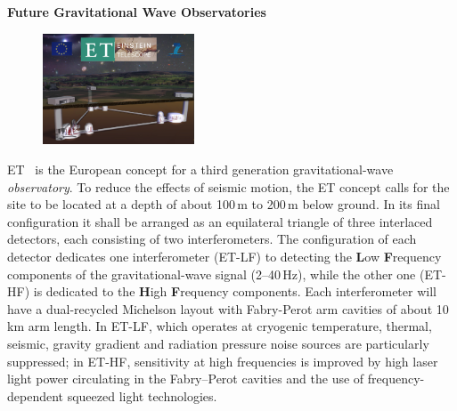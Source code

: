 \begin{DetBox}{\bf Future Gravitational Wave Observatories}
\label{Box:GWOs}
\begin{tcolorbox}[standard jigsaw,colback=amber!10!white,colframe=red!70!black,coltext=black,size=small,  title=The Einstein gravitational--wave Telescope (ET)] 
\begin{figure}
\vspace{-10pt}
\includegraphics*[width=0.4\textwidth]{Figures/ET_Thumb.png}
\label{fig:ET_Thumb}
\vspace{-25pt}
\end{figure}
ET~\cite{ET2011} is the European concept for a third generation gravitational-wave \emph{observatory}. To reduce the effects of seismic motion, the ET concept calls for the site to be located at a depth of about 100\,m to 200\,m below ground. In its final configuration it shall be arranged as an equilateral triangle of three interlaced detectors, each consisting of two interferometers. The configuration of each detector dedicates one interferometer (ET-LF) to detecting the \textbf{L}ow \textbf{F}requency components of the gravitational-wave signal (2--40\,Hz), while the other one (ET-HF) is dedicated to the \textbf{H}igh \textbf{F}requency components. Each interferometer will have a dual-recycled Michelson layout with Fabry-Perot arm cavities of about 10\,km arm length. In ET-LF, which operates at cryogenic temperature, thermal, seismic, gravity gradient and radiation pressure noise sources are particularly suppressed; in ET-HF, sensitivity at high frequencies is improved by high laser light power circulating in the Fabry--Perot cavities and the use of frequency-dependent squeezed light technologies.
\end{tcolorbox}



\end{DetBox}
